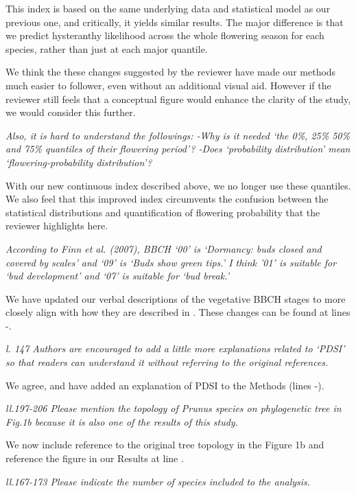 \documentclass{article}[12pt]
\begin{document}
This index is based on the same underlying data and statistical model as our previous one, and critically, it yields similar results. The major difference is that we predict hysteranthy likelihood across the whole flowering season for each species, rather than just at each major quantile. 

We think the these changes suggested by the reviewer have made our methods much easier to follower, even without an additional visual aid. However if the reviewer still feels that a conceptual figure would enhance the clarity of the study, we would consider this further. %

\emph{Also, it is hard to understand the followings:
-Why is it needed ‘the 0\%, 25\% 50\% and 75\% quantiles of their flowering period’?
-Does ‘probability distribution’ mean ‘flowering-probability distribution’?}

With our new continuous index described above, we no longer use these quantiles. We also feel that this improved index circumvents the confusion between the statistical distributions and quantification of flowering probability that the reviewer highlights here. 

\emph{According to Finn et al. (2007), BBCH ‘00’ is ‘Dormancy: buds closed and covered by scales’ and ‘09’ is ‘Buds show green tips.’ I think ’01’ is suitable for ‘bud development’ and ‘07’ is suitable for ‘bud break.’}

We have updated our verbal descriptions of the vegetative BBCH stages to more closely align with how they are described in \citet{Finn2007}. These changes can be found at lines -.

\emph{l. 147 Authors are encouraged to add a little more explanations related to ‘PDSI’ so that readers can understand it without referring to the original references.}

We agree, and have added an explanation of PDSI to the Methods (lines -).

\emph{ll.197-206 Please mention the topology of Prunus species on phylogenetic tree in Fig.1b because it is also one of the results of this study.}

We now include reference to the original tree topology in the Figure 1b and reference the figure in our Results at line .

\emph{ll.167-173 Please indicate the number of species included to the analysis.}
\end{document}
